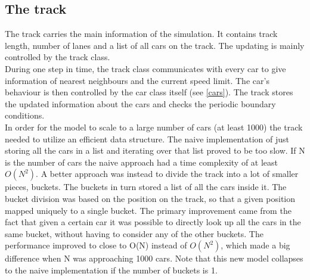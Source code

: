 \documentclass[11pt,a4paper,twocolumn]{article}
\begin{document}
\subsection{The track}\label{track}
The track carries the main information of the simulation. It contains track length, number of lanes and a list of all cars on the track. The updating is mainly controlled by the track class.  \\
During one step in time, the track class communicates with every car to give information of nearest neighbours and the current speed limit. The car's behaviour is then controlled by the car class itself (see \ref{cars}). The track stores the updated information about the cars and checks the periodic boundary conditions. \\

In order for the model to scale to a large number of cars (at least 1000) the track needed to utilize an efficient data structure. The naive implementation of just storing all the cars in a list and iterating over that list proved to be too slow. If N is the number of cars the naive approach had a time complexity of at least $O(N^2)$. A better approach was instead to divide the track into a lot of smaller pieces, buckets. The buckets in turn stored a list of all the cars inside it. The bucket division was based on the position on the track, so that a given position mapped uniquely to a single bucket. The primary improvement came from the fact that given a certain car it was possible to directly look up all the cars in the same bucket, without having to consider any of the other buckets. The performance improved to close to O(N) instead of $O(N^2)$, which made a big difference when N was approaching 1000 cars. Note that this new model collapses to the naive implementation if the number of buckets is 1.
\end{document}
